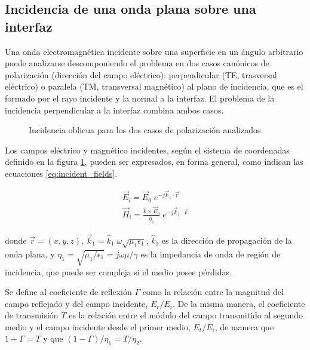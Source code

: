 \subsection{Incidencia de una onda plana sobre una interfaz}

Una onda electromagnética incidente sobre una superficie en un ángulo arbitrario puede analizarse descomponiendo el problema en dos casos canónicos de polarización (dirección del campo eléctrico): perpendicular (TE, trasversal eléctrico) o paralela (TM, transversal magnético) al plano de incidencia, que es el formado por el rayo incidente y la normal a la interfaz. El problema de la incidencia perpendicular a la interfaz combina ambos casos.

\begin{figure} [H]
	\centering 
	\hspace{5mm}
	\caption{Incidencia oblicua para los dos casos de polarización analizados.}
	\label{fig:oblique_incidence}
\end{figure}

Los campos eléctrico y magnético incidentes, según el sistema de coordenadas definido en la figura \ref{fig:oblique_incidence}, pueden ser expresados, en forma general, como indican las ecuaciones \ref{eq:incident_fields}.

\begin{subequations}
	\label{eq:incident_fields}
	\begin{align}
	\vec{E}_i = \vec{E}_0 \;e^{-j\vec{k}_1 \cdot \vec{r}} \\
	\vec{H}_i = \frac{\hat{k} \times \vec{E}_0}{\eta_1} \;e^{-j\vec{k}_1 \cdot \vec{r}}
	\end{align}
\end{subequations}

donde $\vec{r}=(x,y,z)$, $\vec{k}_1 = \hat{k}_1 \;\omega \sqrt{\mu_1 \epsilon_1}$, $\hat{k}_1$ es la dirección de propagación de la onda plana, y $\eta_1 = \sqrt{\mu_1 / \epsilon_1} = j\omega \mu / \gamma$ es la impedancia de onda de región de incidencia, que puede ser compleja si el medio posee pérdidas.

Se define al coeficiente de reflexión $\Gamma$ como la relación entre la magnitud del campo reflejado y del campo incidente, $E_r / E_i$. De la misma manera, el coeficiente de transmisión $T$ es la relación entre el módulo del campo transmitido al segundo medio y el campo incidente desde el primer medio, $E_t / E_i$, de manera que $1+\Gamma = T$ y que $(1-\Gamma)/\eta_1 = T/\eta_2$. 

